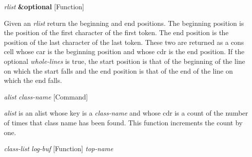 \vspace{1em}
\noindent
{}
\usebox{\funcname}\emph{rlist} \textbf{\&optional}
 \hfill [Function]
\hspace*{\wd\funcname}

\begin{doc-string}
Given an \emph{rlist} return the beginning and end positions.  The beginning position is
the position of the first character of the first token.  The end position is the
position of the last character of the last token.  These two are returned as a cons
cell whose car is the beginning position and whose cdr is the end position.  If
the optional \emph{whole-lines} is true, the start position is that of the beginning of
the line on which the start falls and the end position is that of the end of
the line on which the end falls.
\end{doc-string}

\vspace{1em}
\noindent
{}
\usebox{\funcname}\emph{alist} \emph{class-name}
 \hfill [Command]

\begin{doc-string}
\emph{alist} is an alist whose key is a \emph{class-name} and whose cdr is a count of the
number of times that class name has been found.  This function increments the
count by one.
\end{doc-string}

\vspace{1em}
\noindent
{}
\usebox{\funcname}\emph{class-list} \emph{log-buf}
 \hfill [Function]
\hspace*{\wd\funcname}\emph{top-name}

